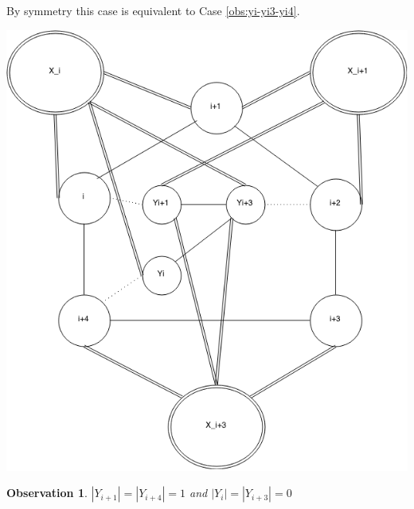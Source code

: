 \documentclass[12pt]{article}
\newtheorem{Observation}[Theorem]{Observation}
\begin{document}
\begin{minipage}{0.5\textwidth}%
	 By symmetry this case is equivalent to Case \ref{obs:yi-yi3-yi4}.
\end{minipage}
\hfill
\begin{minipage}{0.5\textwidth}\raggedleft
	\includegraphics[width=\linewidth]{Yi-Yi1-Yi3.png}
\end{minipage}


\begin{Observation}\label{obs:yi1-yi4} 
$|Y_{i+1}| = |Y_{i+4}| = 1$ and $|Y_{i}| = |Y_{i+3}| = 0$
\end{Observation}
\end{document}
